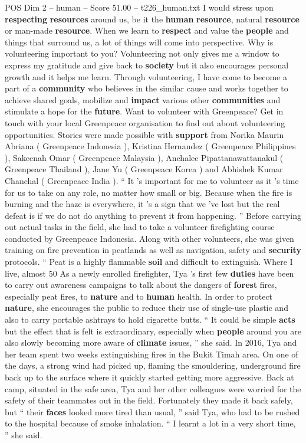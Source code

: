 \begin{textsample}{POS Dim 2 – human – Score 51.00 – t226\_human.txt}
I would stress upon \textbf{respecting} \textbf{resources} around us, be it the \textbf{human} \textbf{resource}, natural \textbf{resource} or man-made \textbf{resource}.
When we learn to \textbf{respect} and value the \textbf{people} and things that surround us, a lot of things will come into perspective.
Why is volunteering important to you?
Volunteering not only gives me a window to express my gratitude and give back to \textbf{society} but it also encourages personal growth and it helps me learn.
Through volunteering, I have come to become a part of a \textbf{community} who believes in the similar cause and works together to achieve shared goals, mobilize and \textbf{impact} various other \textbf{communities} and stimulate a hope for the \textbf{future}.
Want to volunteer with Greenpeace?
Get in touch with your local Greenpeace organisation to find out about volunteering opportunities.
Stories were made possible with \textbf{support} from Norika Maurin Abriana ( Greenpeace Indonesia ), Kristina Hernandez ( Greenpeace Philippines ), Sakeenah Omar ( Greenpeace Malaysia ), Anchalee Pipattanawattanakul ( Greenpeace Thailand ), Jane Yu ( Greenpeace Korea ) and Abhishek Kumar Chanchal ( Greenpeace India ). “ It ’s important for me to volunteer as it ’s time for us to take on any role, no matter how small or big.
Because when the fire is burning and the haze is everywhere, it ’s a sign that we ’ve lost but the real defeat is if we do not do anything to prevent it from happening. ” Before carrying out actual tasks in the field, she had to take a volunteer firefighting course conducted by Greenpeace Indonesia.
Along with other volunteers, she was given training on fire prevention in peatlands as well as navigation, safety and \textbf{security} protocols. “ Peat is a highly flammable \textbf{soil} and difficult to extinguish.
Where I live, almost 50 %
As a newly enrolled firefighter, Tya ’s first few \textbf{duties} have been to carry out awareness campaigns to talk about the dangers of \textbf{forest} fires, especially peat fires, to \textbf{nature} and to \textbf{human} health.
In order to protect \textbf{nature}, she encourages the public to reduce their use of single-use plastic and also to carry portable ashtrays to hold cigarette butts. “ It could be simple \textbf{acts} but the effect that is felt is extraordinary, especially when \textbf{people} around you are also slowly becoming more aware of \textbf{climate} issues, ” she said.
In 2016, Tya and her team spent two weeks extinguishing fires in the Bukit Timah area.
On one of the days, a strong wind had picked up, flaming the smouldering, underground fire back up to the surface where it quickly started getting more aggressive.
Back at camp, situated in the safe area, Tya and her other colleagues were worried for the safety of their teammates out in the field.
Fortunately they made it back safely, but “ their \textbf{faces} looked more tired than usual, ” said Tya, who had to be rushed to the hospital because of smoke inhalation. “ I learnt a lot in a very short time, ” she said.


\end{textsample}

